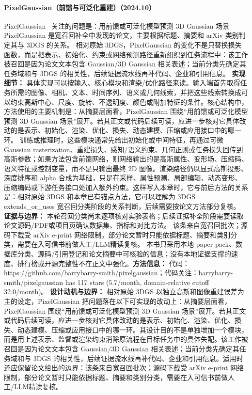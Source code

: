 \paragraph{PixelGaussian（前馈与可泛化重建）（2024.10）}
PixelGaussian~\cite{2410_18979} 关注的问题是：用前馈或可泛化模型预测 3D Gaussian 场景 PixelGaussian 是宽召回补全中发现的论文，主要根据标题、摘要和 arXiv 类别判定其与 3DGS 的关系。
相对原始 3DGS，PixelGaussian 的变化不是只替换损失函数，而是把表示、初始化、约束或网络预测路径重新组织到任务流程中：该工作被召回是因为论文文本包含 Gaussian/3D Gaussian 相关表述；当前分类先确定其任务域和与 3DGS 的相关性，后续证据流水线再补代码、企业和引用信息。
\textbf{实现细节：} 具体实现可以按输入、核心模块和渲染/优化路径来读。输入端首先取得任务所需的图像、相机、文本、时间序列、语义或几何线索，并把这些线索转换成可以约束高斯中心、尺度、旋转、不透明度、颜色或附加特征的条件。核心结构中，方法使用的主要机制是：从摘要层面看，PixelGaussian 围绕“用前馈或可泛化模型预测 3D Gaussian 场景”展开。若其正文或代码后续可读，应进一步核对它具体改动的是表示、初始化、渲染、优化、损失、动态建模、压缩或应用接口中的哪一环。 训练或推理时，这些模块通常先给出初始化或中间特征，再通过可微 Gaussian rasterization、重建损失、感知/语义约束、几何正则或任务损失回传到高斯参数；如果方法包含前馈网络，则网络输出的是高斯属性、变形场、压缩码、语义特征或控制变量，而不是只输出最终 2D 图像。渲染路径仍以显式高斯投影、深度排序和 alpha 合成为基础，只是在采样、属性预测、局部编辑、动态变形、压缩编码或下游任务接口处加入额外约束。这样写入本章时，它与前后方法的关系是：相对原始 3DGS 和本章已有锚点方法，它可以理解为 3DGS extends\_or\_uses 宽召回分类阶段的关系判断，后续需要按论文方法部分复核。
\textbf{证据与边界：} 本轮召回分类尚未逐项核对实验表格；后续证据补全阶段需要读取论文源码/PDF或项目页确认数据集、指标和对比方法。 该条来自宽召回批次；源码下载受 arXiv e-print 网络限制，部分论文暂时只能依据标题、摘要和类别分类，需要在入可信书前做人工/LLM精读复核。 本书只采用本地 paper pack、数据库分类、源码/引用登记和论文摘要中可核验的信息；没有本地证据支撑的速度、排行榜或开源完整性不在正文中强化。\textbf{方法信息：} 代码：\url{https://github.com/barrybarry-smith/pixelgaussian}；代码关注：barrybarry-smith/pixelgaussian has 117 stars (5.7/month, domain-relative cutoff 32.0/month)。
\textbf{设计动机与边界：} 相对原始 3DGS 以独立高斯和图像重建误差为主的设定，PixelGaussian 把问题落在以下可实现的改动上：从摘要层面看，PixelGaussian 围绕“用前馈或可泛化模型预测 3D Gaussian 场景”展开。若其正文或代码后续可读，应进一步核对它具体改动的是表示、初始化、渲染、优化、损失、动态建模、压缩或应用接口中的哪一环。其设计目的不是单独增加一个模块，而是用上述表示、监督或渲染约束消除原流程在目标任务中的具体失配。该工作被召回是因为论文文本包含 Gaussian/3D Gaussian 相关表述；当前分类先确定其任务域和与 3DGS 的相关性，后续证据流水线再补代码、企业和引用信息。适用时还应保留论文给出的边界：该条来自宽召回批次；源码下载受 arXiv e-print 网络限制，部分论文暂时只能依据标题、摘要和类别分类，需要在入可信书前做人工/LLM精读复核。
